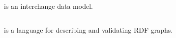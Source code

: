 \subsection{}
 is an interchange data  model. 
\subsection{}
\subsection{}
\subsection{}
 is a language for describing and validating RDF graphs. 